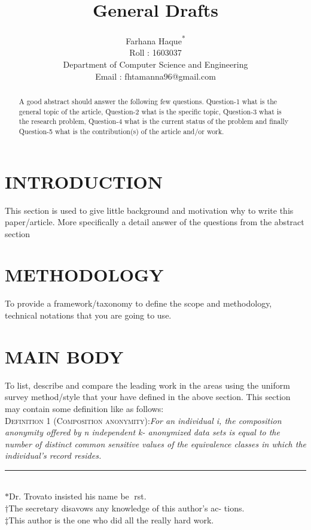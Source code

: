 \documentclass[conference]{sig-alternate}
\begin{document}
\title{General Drafts}

\author{Farhana Haque\textsuperscript{*}\\Roll : 1603037\\Department of Computer Science and Engineering\\Email : fhtamanna96@gmail.com
}


\maketitle


\begin{abstract}
A good abstract should answer the following few
questions. Question-1 what is the general topic of the article,
Question-2 what is the specific topic, Question-3 what is the
research problem, Question-4 what is the current status of the
problem and finally Question-5 what is the contribution(s) of the
article and/or work.
\end{abstract}

\section{INTRODUCTION}
This section is used to give little background and motivation
why to write this paper/article. More specifically a detail
answer of the questions from the abstract section



\section{METHODOLOGY}
To provide a framework/taxonomy to define the scope and
methodology, technical notations that you are going to use.

\section{MAIN BODY}
To list, describe and compare the leading work in the areas
using the uniform survey method/style that your have defined
in the above section. This section may contain some definition
like as follows:\\
\textsc{Definition 1 (Composition anonymity):}\textit{For an individual i,
the composition anonymity offered by n independent k-
anonymized data sets is equal to the number of distinct
common sensitive values of the equivalence classes in which
the individual’s record resides.}\\
\noindent\rule{4cm}{0.4pt}\\
$\ast$Dr. Trovato insisted his name be rst.\\
$\dagger$The secretary disavows any knowledge of this author's ac-
tions.\\
$\ddagger$This author is the one who did all the really hard work.
\end{document}
